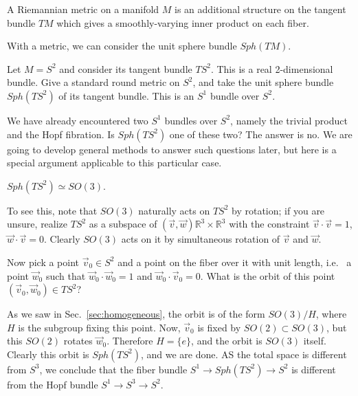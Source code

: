 \documentclass[12pt]{article}
\numberwithin{equation}{section}
\def\bR{\mathbb{R}}
\begin{document}
\begin{definition}
A Riemannian metric on a manifold $M$
is an additional structure on the tangent bundle $TM$
which gives a smoothly-varying inner product 
on each fiber.
\end{definition}

With a metric, we can consider the unit sphere bundle $Sph(TM)$.

\begin{example}
Let $M=S^2$ and consider its tangent bundle $TS^2$.
This is a real 2-dimensional bundle.
Give a standard round metric on $S^2$,
and take the unit sphere bundle $Sph(TS^2)$ of its tangent bundle.
This is an $S^1$ bundle over $S^2$.
\end{example}
We have already encountered two $S^1$ bundles over $S^2$,
namely the trivial product and the Hopf fibration.
Is $Sph(TS^2)$ one of these two?
The answer is no.
We are going to develop general methods to answer such questions later,
but here is a special argument applicable to this particular case.
\begin{example}
$Sph(TS^2) \simeq SO(3)$.
\end{example}
To see this, note that $SO(3)$ naturally acts on $TS^2$ by rotation;
if you are unsure, realize $TS^2$ as a subspace of $(\vec v,\vec w) \bR^3\times \bR^3$
with the constraint $\vec v\cdot \vec v=1$, $\vec w\cdot \vec v=0$.
Clearly $SO(3)$ acts on it by simultaneous rotation of $\vec v$ and $\vec w$.

Now pick a point $\vec v_0 \in S^2$ and a point on the fiber over it with unit length, 
i.e.~ a point $\vec w_0$ such that $\vec w_0\cdot \vec w_0=1$ and $\vec w_0\cdot \vec v_0 =0$.
What is the orbit of this point $(\vec v_0,\vec w_0)\in TS^2$?

As we saw in Sec.~\ref{sec:homogeneous}, the orbit is of the form $SO(3)/H$, where $H$ is the subgroup fixing this point.
Now, $\vec v_0$ is fixed by $SO(2)\subset SO(3)$, but this $SO(2)$ rotates $\vec w_0$.
Therefore $H=\{e\}$, and the orbit is $SO(3)$ itself.
Clearly this orbit is $Sph(TS^2)$, and we are done.
AS the total space is different from $S^3$, we conclude that the fiber bundle $S^1\to Sph(TS^2)\to S^2$ is different from the Hopf bundle $S^1\to S^3\to S^2$.
\end{document}
